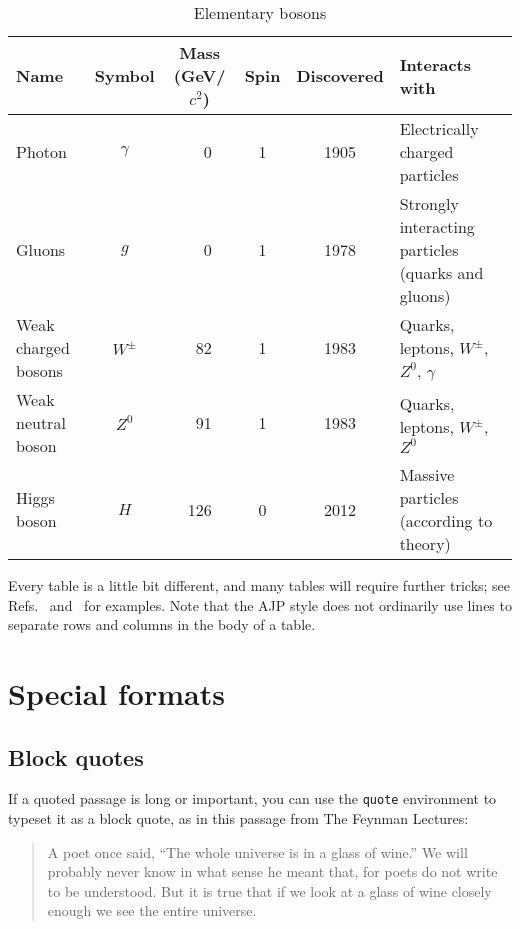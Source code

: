 \documentclass[prb,preprint]{revtex4-1}
\begin{document}
\begin{table}[h!]
\centering
\caption{Elementary bosons}
\begin{ruledtabular}
\begin{tabular}{l c c c c p{5cm}}
Name & Symbol & Mass (GeV/$c^2$) & Spin & Discovered & Interacts with \\
\hline	%
Photon & $\gamma$ & \ \ 0 & 1 & 1905 & Electrically charged particles \\
Gluons & $g$ & \ \ 0 & 1 & 1978 & Strongly interacting particles (quarks and gluons) \\
Weak charged bosons & $W^\pm$ & \ 82 & 1 & 1983 & Quarks, leptons, $W^\pm$, $Z^0$, $\gamma$ \\
Weak neutral boson & $Z^0$ & \ 91 & 1 & 1983 & Quarks, leptons, $W^\pm$, $Z^0$ \\
Higgs boson & $H$ & 126 & 0 & 2012 & Massive particles (according to theory) \\
\end{tabular}
\end{ruledtabular}
\label{bosons}
\end{table}

Every table is a little bit different, and many tables will require
further tricks; see Refs.\  and~
for examples.  Note that the AJP style does not ordinarily use lines 
to separate rows and columns in the body of a table.


\section{Special formats}

\subsection{Block quotes}  %

If a quoted passage is long or important, you can use the \texttt{quote} 
environment to typeset it as a block quote, as in this passage from The 
Feynman Lectures:\cite{feynman}
\begin{quote}
A poet once said, ``The whole universe is in a glass of wine.'' We will 
probably never know in what sense he meant that, for poets do not write 
to be understood. But it is true that if we look at a glass of wine closely 
enough we see the entire universe.
\end{quote}
\end{document}
